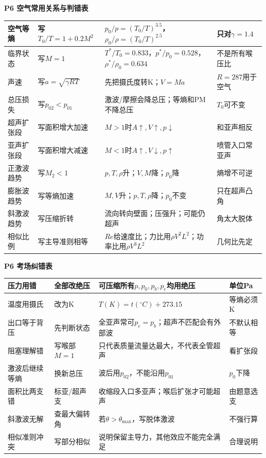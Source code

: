 \documentclass[UTF8,a4paper]{ctexart}
\newcommand{\ftitle}[1]{\vspace{1pt}\textbf{\textcolor{B}{#1}}\par\vspace{0.5pt}}
\begin{document}
\ftitle{P6 空气常用关系与判错表}
\begin{tabular}{|L{0.19\textwidth}|L{0.23\textwidth}|L{0.34\textwidth}|L{0.19\textwidth}|}\hline
空气等熵 & 写$T_0/T=1+0.2M^2$ & $p_0/p=(T_0/T)^{3.5}$，$\rho_0/\rho=(T_0/T)^{2.5}$ & 只对$\gamma=1.4$ \\\hline
临界状态 & 写$M=1$ & $T^*/T_0=0.833$，$p^*/p_0=0.528$，$\rho^*/\rho_0=0.634$ & 不是所有喉压比 \\\hline
声速 & 写$a=\sqrt{\gamma RT}$ & 先把摄氏度转K；$V=Ma$ & $R=287$用于空气 \\\hline
总压损失 & 写$p_{02}<p_{01}$ & 激波/摩擦会降总压；等熵和PM不降总压 & $T_0$可不变 \\\hline
超声扩张段 & 写面积增大加速 & $M>1$时$A\uparrow,V\uparrow,p\downarrow$ & 和亚声相反 \\\hline
亚声扩张段 & 写面积增大减速 & $M<1$时$A\uparrow,V\downarrow,p\uparrow$ & 喷管入口常亚声 \\\hline
正激波趋势 & 写$M_2<1$ & $p,T,\rho$升；$V,M$降；$p_0$降 & 熵增不可逆 \\\hline
膨胀波趋势 & 写等熵加速 & $M,V$升；$p,T,\rho$降；$p_0$不变 & 只在超声凸角 \\\hline
斜激波趋势 & 写压缩折转 & 流向转向壁面；压强升；可能仍超声 & 角太大脱体 \\\hline
相似比例 & 写主导准则相等 & $Re$给速度比；力比用$\rho V^2L^2$；功率比用$\rho V^3L^2$ & 几何比先定 \\\hline
\end{tabular}
\ftitle{P6 考场纠错表}
\begin{tabular}{|L{0.22\textwidth}|L{0.25\textwidth}|L{0.33\textwidth}|L{0.15\textwidth}|}\hline
压力用错 & 全部改绝压 & 可压缩所有$p,p_0,p_b,p_e$均用绝压 & 单位Pa \\\hline
温度用摄氏 & 改为K & $T(K)=t(^\circ C)+273.15$ & 等熵必须K \\\hline
出口等于背压 & 先判断状态 & 全亚声常可$p_e=p_b$；超声不匹配会有外部波 & 不默认相等 \\\hline
阻塞理解错 & 写喉部$M=1$ & 只代表质量流量达最大，不代表全管超声 & 看扩张段 \\\hline
激波后继续等熵 & 换新总压 & 波后用$p_{02}$，不能沿用$p_{01}$ & $p_0$下降 \\\hline
面积比两支错 & 标亚/超声支 & 收缩段入口多亚声；喉后扩张才可能超声 & 由题意选支 \\\hline
斜激波无解 & 查最大偏转角 & 若$\theta>\theta_{\max}$，写脱体激波 & 不强行算 \\\hline
相似准则冲突 & 写部分相似 & 说明保留主导力，其他效应不能完全满足 & 合理说明 \\\hline
\end{tabular}
\end{document}

